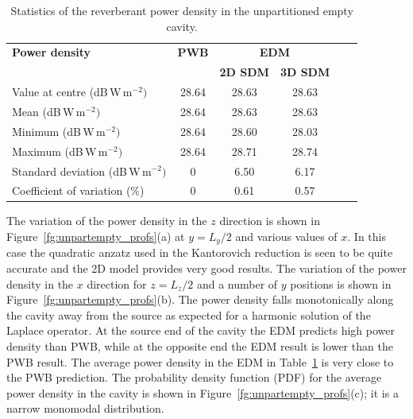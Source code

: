 \documentclass[a4paper]{article}
\numberwithin{equation}{section}
\newcounter{Table}
\newcounter{Figure}
\begin{document}
\begin{table}[ht]
\begin{center}
\begin{tabular}{|l|c|c|c|c|c|}
\hline
\textbf{Power density}               &\textbf{PWB} &\multicolumn{2}{|c|}{\textbf{EDM}} \\ \cline{3-4}
{}                                   &{}           &\textbf{2D SDM} &\textbf{3D SDM}  \\
\hline
Value at centre (dB\,W\,m$^{-2})$    &28.64        &28.63           &28.63 \\
Mean (dB\,W\,m$^{-2})$               &28.64        &28.63           &28.63 \\
Minimum (dB\,W\,m$^{-2})$            &28.64        &28.60           &28.03 \\
Maximum (dB\,W\,m$^{-2})$            &28.64        &28.71           &28.74 \\
Standard deviation (dB\,W\,m$^{-2})$ &0            &6.50            &6.17  \\
Coefficient of variation (\%)        &0            &0.61            &0.57  \\
\hline
\end{tabular}
\end{center}
\caption{\label{tb:unpartempty} Statistics of the reverberant power density in the unpartitioned empty cavity.}
\end{table}

The variation of the power density in the $z$ direction is shown in Figure~\ref{fg:unpartempty_profs}(a)
at $y=L_y/2$ and various values of $x$. In this case the quadratic anzatz used in the Kantorovich reduction
is seen to be quite accurate and the 2D model provides very good results. The variation of the power density 
in the $x$ direction for $z=L_z/2$ and a number of $y$ positions is shown in Figure~\ref{fg:unpartempty_profs}(b).
The power density falls monotonically along the cavity away from the source as expected for a harmonic solution
of the Laplace operator. At the source end of the cavity the EDM predicts high power density than PWB, while 
at the opposite end the EDM result is lower than the PWB result. The average power density in the EDM in 
Table~\ref{tb:unpartempty} is very close to the PWB prediction. The probability density function (PDF)
for the average power density in the cavity is shown in Figure~\ref{fg:unpartempty_profs}(c); it is a narrow
monomodal distribution.
\end{document}
